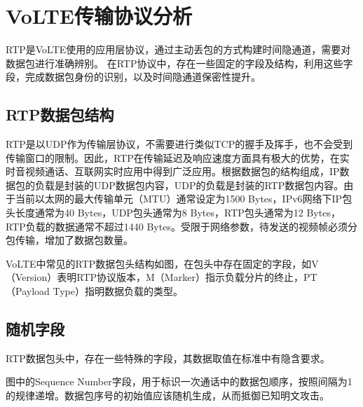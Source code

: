 \section{VoLTE传输协议分析}
\label{chap:backinfo:rtp}

RTP是VoLTE使用的应用层协议，通过主动丢包的方式构建时间隐通道，需要对数据包进行准确辨别。
在RTP协议中，存在一些固定的字段及结构，利用这些字段，完成数据包身份的识别，以及时间隐通道保密性提升。

\subsection{RTP数据包结构}
\label{chap:backinfo:rtp:struct}

RTP是以UDP作为传输层协议，不需要进行类似TCP的握手及挥手，也不会受到传输窗口的限制。因此，RTP在传输延迟及响应速度方面具有极大的优势，在实时音视频通话、互联网实时应用中得到广泛应用。根据数据包的结构组成，IP数据包的负载是封装的UDP数据包内容，UDP的负载是封装的RTP数据包内容。由于当前以太网的最大传输单元（MTU）通常设定为1500 Bytes，IPv6网络下IP包头长度通常为40 Bytes，UDP包头通常为8 Bytes，RTP包头通常为12 Bytes，RTP负载的数据通常不超过1440 Bytes。受限于网络参数，待发送的视频帧必须分包传输，增加了数据包数量。


VoLTE中常见的RTP数据包头结构如图，在包头中存在固定的字段，如V（Version）表明RTP协议版本，M（Marker）指示负载分片的终止，PT（Payload Type）指明数据负载的类型。

\subsection{随机字段}
\label{chap:backinfo:rtp:random}

RTP数据包头中，存在一些特殊的字段，其数据取值在标准中有隐含要求。

图中的Sequence Number字段，用于标识一次通话中的数据包顺序，按照间隔为1的规律递增。数据包序号的初始值应该随机生成，从而抵御已知明文攻击。

